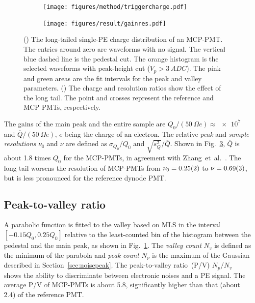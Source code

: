 \begin{figure}[!htbp]
    \centering
    \begin{subfigure}[b]{\SF\textwidth}
        \texttt{[image: figures/method/triggercharge.pdf]}
        \caption{}%
        \label{fig:triggercharge}
    \end{subfigure}
    \begin{subfigure}[b]{\SF\textwidth}
        \texttt{[image: figures/result/gainres.pdf]}
        \caption{}
        \label{fig:totalchargeCompare}
    \end{subfigure}
    \caption{() The long-tailed single-PE charge distribution of an MCP-PMT. The entries around zero are waveforms with no signal. The vertical blue dashed line is the pedestal cut. The orange histogram is the selected waveforms with peak-height cut ($V_p>\SI{3}{ADC}$). The pink and green areas are the fit intervals for the peak and valley parameters. () The charge and resolution ratios show the effect of the long tail. The point and crosses represent the reference and MCP PMTs, respectively.
    }
\end{figure}

The gains of the main peak and the entire sample are ${Q_0}/({\SI{50}{\Omega}} e) \approx \num{e7}$ and ${\overline{Q}}/(\SI{50}{\Omega} e)$, $e$ being the charge of an electron. The relative \emph{peak} and \emph{sample resolutions} $\nu_0$ and $\nu$ are defined as ${\sigma_{Q_0}}/{Q_0}$ and ${\sqrt{s^2_{Q}}}/{\overline{Q}}$.  Shown in Fig.~\ref{fig:totalchargeCompare}, $\overline{Q}$ is about 1.8 times $Q_0$ for the MCP-PMTs, in agreement with Zhang~et~al.~\cite{JUNOLongtail}. The long tail worsens the resolution of MCP-PMTs from $\nu_0=\num{0.25 \pm 0.02}$ to $\nu=\num{0.69 \pm 0.03}$, but is less pronounced for the reference dynode PMT.

\subsection{Peak-to-valley ratio}
\label{sec:PV}
A parabolic function is fitted to the valley based on MLS in the interval $[-0.15Q_0, 0.25Q_0]$ relative to the least-counted bin of the histogram between the pedestal and the main peak, as shown in Fig.~\ref{fig:triggercharge}. The \emph{valley count} $N_v$ is defined as the minimum of the parabola and \emph{peak count} $N_p$ is the maximum of the Gaussian described in Section~\ref{sec:noisepeak}. The peak-to-valley ratio~(P/V) ${N_p}/{N_v}$ shows the ability to discriminate between electronic noises and a PE signal. The average P/V of MCP-PMTs is about 5.8, significantly higher than that (about 2.4) of the reference PMT.

